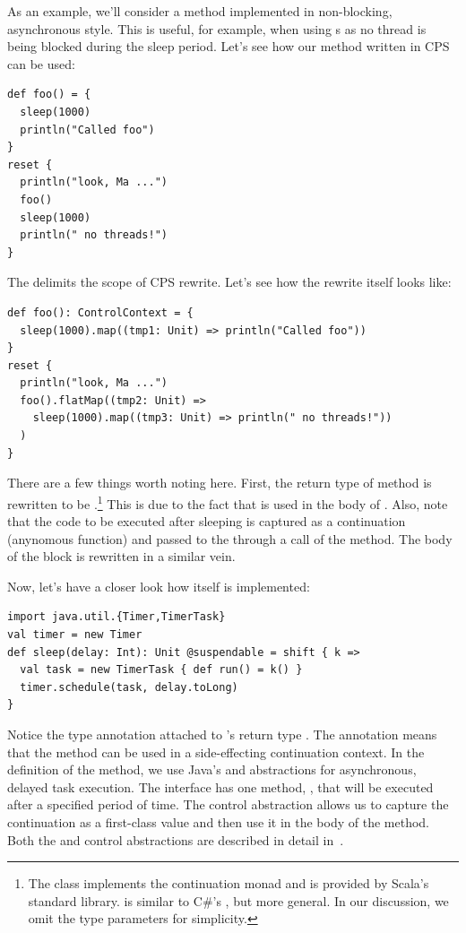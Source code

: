 \documentclass[runningheads,a4paper]{llncs}
\begin{document}
As an example, we'll consider a  method implemented in non-blocking, asynchronous style. This is useful, for example, when using s as no thread is being blocked during the sleep period. Let's see how our  method written in CPS can be used:

\begin{lstlisting}
def foo() = {
  sleep(1000)
  println("Called foo")
}
reset {
  println("look, Ma ...")
  foo()
  sleep(1000)
  println(" no threads!")
}
\end{lstlisting}

The  delimits the scope of CPS rewrite. Let's see how the rewrite itself looks like:

\begin{lstlisting}
def foo(): ControlContext = {
  sleep(1000).map((tmp1: Unit) => println("Called foo"))
}
reset {
  println("look, Ma ...")
  foo().flatMap((tmp2: Unit) =>
    sleep(1000).map((tmp3: Unit) => println(" no threads!"))
  )
}
\end{lstlisting}

There are a few things worth noting here. First, the return type of
 method is rewritten to be
.\footnote{The  class
  implements the continuation monad and is provided by Scala's
  standard library.  is similar to C\#'s
  , but more general. In our discussion, we omit the
  type parameters for simplicity.} This is due to the fact that
 is used in the body of . Also, note that the
code to be executed after sleeping is captured as a continuation
(anynomous function) and passed to the  through a
call of the  method. The body of the  block is
rewritten in a similar vein.

Now, let's have a closer look how  itself is implemented:

\begin{lstlisting}[label={code:cps_scala},caption={\code{sleep} implementation}]
import java.util.{Timer,TimerTask}
val timer = new Timer
def sleep(delay: Int): Unit @suspendable = shift { k =>
  val task = new TimerTask { def run() = k() }
  timer.schedule(task, delay.toLong)
}
\end{lstlisting}

Notice the  type annotation attached to 's return type . The  annotation means that the  method can be used in a side-effecting continuation context. In the definition of the  method, we use Java's  and  abstractions for asynchronous, delayed task execution. The  interface has one method, , that will be executed after a specified period of time. The  control abstraction allows us to capture the continuation as a first-class value and then use it in the body of the  method. Both the  and  control abstractions are described in detail in~\cite{danvy90}.
\end{document}
